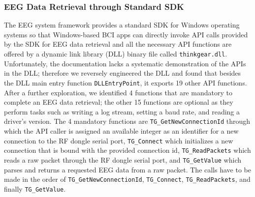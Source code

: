 \subsubsection{EEG Data Retrieval through Standard SDK}
The EEG system framework provides a standard SDK for Windows operating systems so that Windows-based BCI apps can directly invoke API calls provided by the SDK for EEG data retrieval and all the necessary API functions are offered by a dynamic link library (DLL) binary file called \texttt{thinkgear.dll}. Unfortunately, the documentation lacks a systematic demonstration of the APIs in the DLL; therefore we reversely engineered the DLL and found that besides the DLL main entry function \texttt{DLLEntryPoint}, it exports 19 other API functions. After a further exploration, we identified 4 functions that are mandatory to complete an EEG data retrieval; the other 15 functions are optional as they perform tasks such as writing a log stream, setting a baud rate, and reading a driver's version. The 4 mandatory functions are \texttt{TG\_GetNewConnectionId} through which the API caller is assigned an available integer as an identifier for a new connection to the RF dongle serial port, \texttt{TG\_Connect} which initializes a new connection that is bound with the provided connection id, \texttt{TG\_ReadPackets} which reads a raw packet through the RF dongle serial port, and \texttt{TG\_GetValue} which parses and returns a requested EEG data from a raw packet. The calls have to be made in the order of \texttt{TG\_GetNewConnectionId}, \texttt{TG\_Connect}, \texttt{TG\_ReadPackets}, and finally \texttt{TG\_GetValue}.


